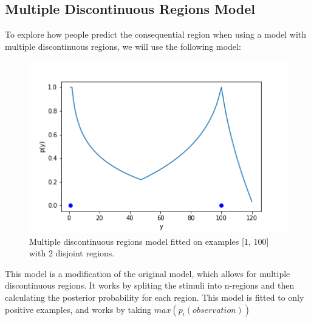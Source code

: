 \documentclass[12pt, ]{scrartcl}
\begin{document}
\begin{multicols}{2}
\section{Multiple Discontinuous Regions Model}
To explore how people predict the consequential region when using a model with multiple discontinuous regions, we will use the following model:
\begin{figure}[H]
	\centering
	\includegraphics[scale=0.5]{graphics/mprm_model}
	\caption{Multiple discontinuous regions model fitted on examples [1, 100] with 2 disjoint regions.}
\end{figure}
This model is a modification of the original model, which allows for multiple discontinuous regions. It works by spliting the stimuli into n-regions and then calculating the posterior probability for each region.
This model is fitted to only positive examples, and works by taking $max(p_i(observation))$


\centering

\nocite{*}
\printbibliography
\end{multicols}
\end{document}
